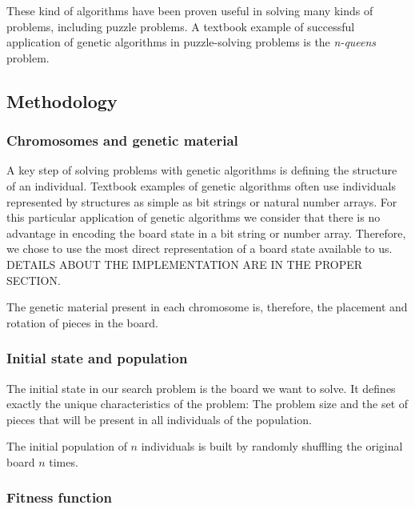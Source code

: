 \documentclass{llncs}
\begin{document}
These kind of algorithms have been proven useful in solving many kinds of problems, including puzzle problems. A textbook example of successful application of genetic algorithms in puzzle-solving problems is the \textit{n-queens} problem\cite{eastridge}.

\subsection{Methodology}\label{sec:methodology}

\subsubsection{Chromosomes and genetic material}

A key step of solving problems with genetic algorithms is defining the structure of an individual. Textbook examples of genetic algorithms often use individuals represented by structures as simple as bit strings or natural number arrays. For this particular application of genetic algorithms we consider that there is no advantage in encoding the board state in a bit string or number array. Therefore, we chose to use the most direct representation of a board state available to us. DETAILS ABOUT THE IMPLEMENTATION ARE IN THE PROPER SECTION.

The genetic material present in each chromosome is, therefore, the placement and rotation of pieces in the board.



\subsubsection{Initial state and population}
The initial state in our search problem is the board we want to solve. It defines exactly the unique characteristics of the problem: The problem size and the set of pieces that will be present in all individuals of the population.

The initial population of $n$ individuals is built by randomly shuffling the original board $n$ times.

\subsubsection{Fitness function}\label{sec:fitness-function}
\end{document}
